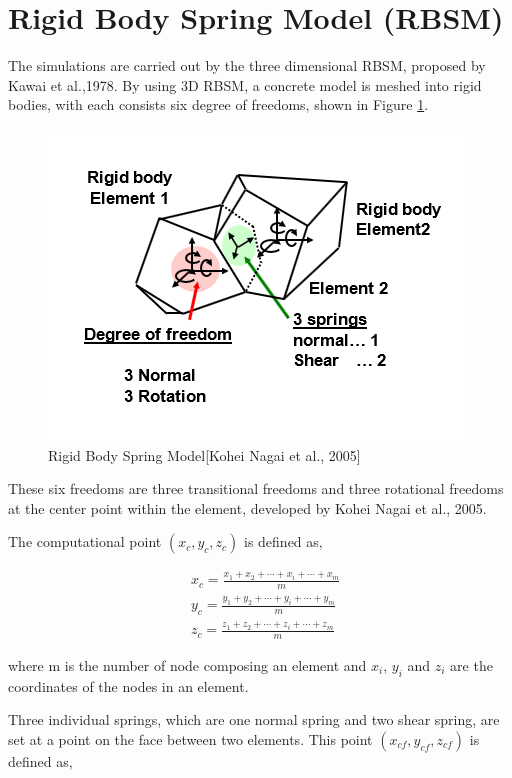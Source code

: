 \section{Rigid Body Spring Model (RBSM)}

The simulations are carried out by the three dimensional RBSM, proposed by Kawai et al.,1978\cite{Kawai}. By using 3D RBSM, a concrete model is meshed into rigid bodies, with each consists six degree of freedoms, shown in Figure \ref{fig:RBSM}.

\begin{figure}[ht!]
\centering
\includegraphics[width=.6\linewidth]{Files/Background/RBSM_1.png}
  \caption{Rigid Body Spring Model[Kohei Nagai et al., 2005\cite{Nagai}]}
  \label{fig:RBSM}
\end{figure}

These six freedoms are three transitional freedoms and three rotational freedoms at the center point within the element, developed by Kohei Nagai et al., 2005\cite{Nagai}.

The computational point $(x_c, y_c, z_c)$ is defined as,

\begin{equation}
  \begin{aligned}
  &x_c=\frac{x_1 + x_2 + \cdots + x_i + \cdots + x_m}{m} \\
  &y_c=\frac{y_1 + y_2 + \cdots + y_i + \cdots + y_m}{m} \\
  &z_c=\frac{z_1 + z_2 + \cdots + z_i + \cdots + z_m}{m}
  \end{aligned}
\end{equation}

where m is the number of node composing an element and $x_i$, $y_i$ and $z_i$ are the coordinates of the nodes in an element.

Three individual springs, which are one normal spring and two shear spring, are set at a point on the face between two elements. This point $(x_{cf}, y_{cf}, z_{cf})$ is defined as,

